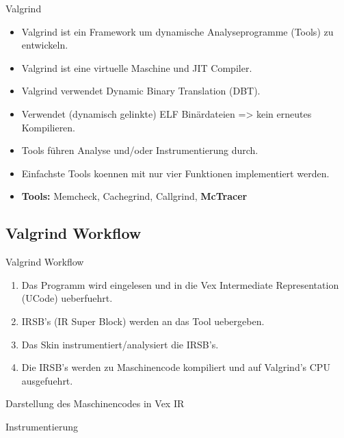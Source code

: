 \begin{frame}{Valgrind}
	\begin{itemize}
		\item Valgrind ist ein Framework um dynamische Analyseprogramme (Tools) zu entwickeln.
		\pause \item Valgrind ist eine virtuelle Maschine und JIT Compiler.
		\pause \item Valgrind verwendet Dynamic Binary Translation (DBT).
        \pause \item Verwendet (dynamisch gelinkte) ELF Binärdateien => kein erneutes Kompilieren.
		\pause \item Tools führen Analyse und/oder Instrumentierung durch.
		\pause \item Einfachste Tools koennen mit nur vier Funktionen implementiert werden.
		\pause \item{\bf Tools:} Memcheck, Cachegrind, Callgrind, {\bf McTracer} 
	\end{itemize}
\end{frame}

\subsection{Valgrind Workflow}

\begin{frame}{Valgrind Workflow}
	\begin{enumerate}
		\item Das Programm wird eingelesen und in die Vex Intermediate Representation (UCode) ueberfuehrt.
		\pause \item IRSB's (IR Super Block) werden an das Tool uebergeben. 
		\pause \item Das Skin instrumentiert/analysiert die IRSB's.
		\pause \item Die IRSB's werden zu Maschinencode kompiliert und auf Valgrind's CPU ausgefuehrt. 
	\end{enumerate}
\end{frame}

\begin{frame}{Darstellung des Maschinencodes in Vex IR}
	\lstset{frame=single}
	
\end{frame}

\begin{frame}{Instrumentierung}
	\lstset{frame=single}
		
\end{frame}

